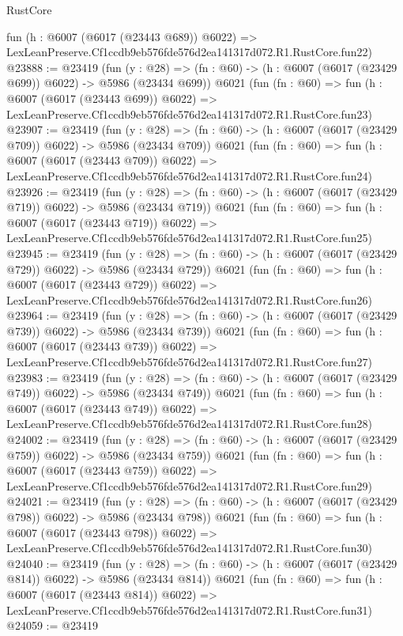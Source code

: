 \begin{lexlean}{RustCore}
\begin{coremodule}
    fun (h : @6007 (@6017 (@23443 @689)) @6022) =>
    LexLeanPreserve.Cf1ccdb9eb576fde576d2ea141317d072.R1.RustCore.fun22)
@23888 := @23419
    (fun (y : @28) => (fn : @60) -> (h : @6007 (@6017 (@23429 @699)) @6022) -> @5986 (@23434 @699))
    @6021
    (fun (fn : @60) =>
    fun (h : @6007 (@6017 (@23443 @699)) @6022) =>
    LexLeanPreserve.Cf1ccdb9eb576fde576d2ea141317d072.R1.RustCore.fun23)
@23907 := @23419
    (fun (y : @28) => (fn : @60) -> (h : @6007 (@6017 (@23429 @709)) @6022) -> @5986 (@23434 @709))
    @6021
    (fun (fn : @60) =>
    fun (h : @6007 (@6017 (@23443 @709)) @6022) =>
    LexLeanPreserve.Cf1ccdb9eb576fde576d2ea141317d072.R1.RustCore.fun24)
@23926 := @23419
    (fun (y : @28) => (fn : @60) -> (h : @6007 (@6017 (@23429 @719)) @6022) -> @5986 (@23434 @719))
    @6021
    (fun (fn : @60) =>
    fun (h : @6007 (@6017 (@23443 @719)) @6022) =>
    LexLeanPreserve.Cf1ccdb9eb576fde576d2ea141317d072.R1.RustCore.fun25)
@23945 := @23419
    (fun (y : @28) => (fn : @60) -> (h : @6007 (@6017 (@23429 @729)) @6022) -> @5986 (@23434 @729))
    @6021
    (fun (fn : @60) =>
    fun (h : @6007 (@6017 (@23443 @729)) @6022) =>
    LexLeanPreserve.Cf1ccdb9eb576fde576d2ea141317d072.R1.RustCore.fun26)
@23964 := @23419
    (fun (y : @28) => (fn : @60) -> (h : @6007 (@6017 (@23429 @739)) @6022) -> @5986 (@23434 @739))
    @6021
    (fun (fn : @60) =>
    fun (h : @6007 (@6017 (@23443 @739)) @6022) =>
    LexLeanPreserve.Cf1ccdb9eb576fde576d2ea141317d072.R1.RustCore.fun27)
@23983 := @23419
    (fun (y : @28) => (fn : @60) -> (h : @6007 (@6017 (@23429 @749)) @6022) -> @5986 (@23434 @749))
    @6021
    (fun (fn : @60) =>
    fun (h : @6007 (@6017 (@23443 @749)) @6022) =>
    LexLeanPreserve.Cf1ccdb9eb576fde576d2ea141317d072.R1.RustCore.fun28)
@24002 := @23419
    (fun (y : @28) => (fn : @60) -> (h : @6007 (@6017 (@23429 @759)) @6022) -> @5986 (@23434 @759))
    @6021
    (fun (fn : @60) =>
    fun (h : @6007 (@6017 (@23443 @759)) @6022) =>
    LexLeanPreserve.Cf1ccdb9eb576fde576d2ea141317d072.R1.RustCore.fun29)
@24021 := @23419
    (fun (y : @28) => (fn : @60) -> (h : @6007 (@6017 (@23429 @798)) @6022) -> @5986 (@23434 @798))
    @6021
    (fun (fn : @60) =>
    fun (h : @6007 (@6017 (@23443 @798)) @6022) =>
    LexLeanPreserve.Cf1ccdb9eb576fde576d2ea141317d072.R1.RustCore.fun30)
@24040 := @23419
    (fun (y : @28) => (fn : @60) -> (h : @6007 (@6017 (@23429 @814)) @6022) -> @5986 (@23434 @814))
    @6021
    (fun (fn : @60) =>
    fun (h : @6007 (@6017 (@23443 @814)) @6022) =>
    LexLeanPreserve.Cf1ccdb9eb576fde576d2ea141317d072.R1.RustCore.fun31)
@24059 := @23419

\end{coremodule}
\end{lexlean}
